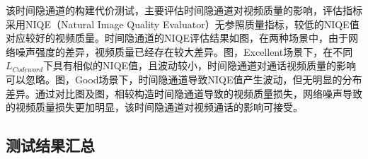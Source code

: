 
该时间隐通道的构建代价测试，主要评估时间隐通道对视频质量的影响，评估指标采用NIQE（Natural Image Quality Evaluator）无参照质量指标，较低的NIQE值对应较好的视频质量。时间隐通道的NIQE评估结果如图，在两种场景中，由于网络噪声强度的差异，视频质量已经存在较大差异。图，Excellent场景下，在不同$L_{Codeword}$下具有相似的NIQE值，且波动较小，时间隐通道对通话视频质量的影响可以忽略。图，Good场景下，时间隐通道导致NIQE值产生波动，但无明显的分布差异。通过对比图及图，相较构造时间隐通道导致的视频质量损失，网络噪声导致的视频质量损失更加明显，该时间隐通道对视频通话的影响可接受。

\subsection{测试结果汇总}
\label{chap:hash:result:evaluation}

